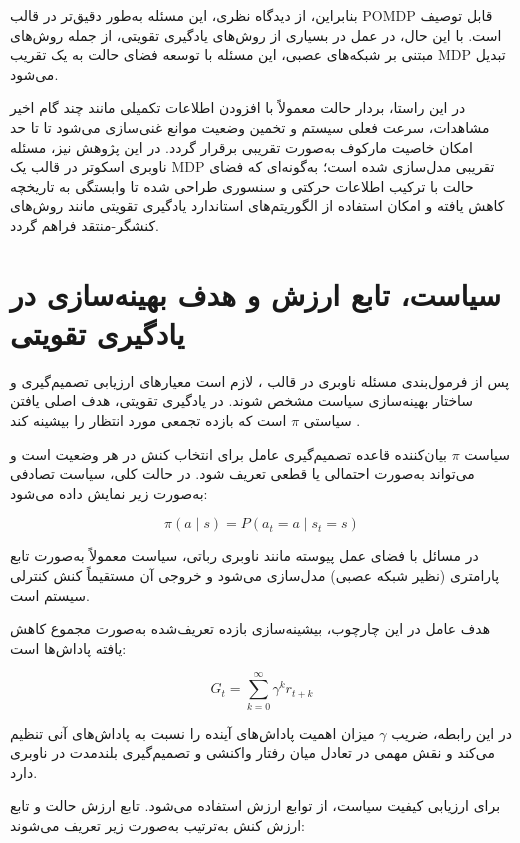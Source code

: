 بنابراین، از دیدگاه نظری، این مسئله به‌طور دقیق‌تر در قالب POMDP قابل توصیف است. با این حال، در عمل در بسیاری از روش‌های یادگیری تقویتی، از جمله روش‌های مبتنی بر شبکه‌های عصبی، این مسئله با توسعه فضای حالت به یک تقریب MDP تبدیل می‌شود.

در این راستا، بردار حالت معمولاً با افزودن اطلاعات تکمیلی مانند چند گام اخیر مشاهدات، سرعت فعلی سیستم و تخمین وضعیت موانع غنی‌سازی می‌شود تا تا حد امکان خاصیت مارکوف به‌صورت تقریبی برقرار گردد. در این پژوهش نیز، مسئله ناوبری اسکوتر در قالب یک MDP تقریبی مدل‌سازی شده است؛ به‌گونه‌ای که فضای حالت با ترکیب اطلاعات حرکتی و سنسوری طراحی شده تا وابستگی به تاریخچه کاهش یافته و امکان استفاده از الگوریتم‌های استاندارد یادگیری تقویتی مانند روش‌های کنشگر-منتقد فراهم گردد.

\section{سیاست، تابع ارزش و هدف بهینه‌سازی در یادگیری تقویتی}

پس از فرمول‌بندی مسئله ناوبری در قالب ، لازم است معیارهای ارزیابی تصمیم‌گیری و ساختار بهینه‌سازی سیاست مشخص شوند. در یادگیری تقویتی، هدف اصلی یافتن سیاستی $\pi$ است که بازده تجمعی مورد انتظار را بیشینه کند \cite{SuttonBarto2018}.

سیاست $\pi$ بیان‌کننده قاعده تصمیم‌گیری عامل برای انتخاب کنش در هر وضعیت است و می‌تواند به‌صورت احتمالی یا قطعی تعریف شود. در حالت کلی، سیاست تصادفی به‌صورت زیر نمایش داده می‌شود:

\begin{equation}\label{probable_policy}
	\pi(a \mid s) = P(a_t = a \mid s_t = s)
\end{equation}

در مسائل با فضای عمل پیوسته مانند ناوبری رباتی، سیاست معمولاً به‌صورت تابع پارامتری (نظیر شبکه عصبی) مدل‌سازی می‌شود و خروجی آن مستقیماً کنش کنترلی سیستم است.

هدف عامل در این چارچوب، بیشینه‌سازی بازده تعریف‌شده به‌صورت مجموع کاهش یافته پاداش‌ها است:

\begin{equation}\label{return}
	G_t = \sum_{k=0}^{\infty} \gamma^k r_{t+k}
\end{equation}

در این رابطه، ضریب $\gamma$ میزان اهمیت پاداش‌های آینده را نسبت به پاداش‌های آنی تنظیم می‌کند و نقش مهمی در تعادل میان رفتار واکنشی و تصمیم‌گیری بلندمدت در ناوبری دارد.

برای ارزیابی کیفیت سیاست، از توابع ارزش استفاده می‌شود. تابع ارزش حالت و تابع ارزش کنش به‌ترتیب به‌صورت زیر تعریف می‌شوند:

